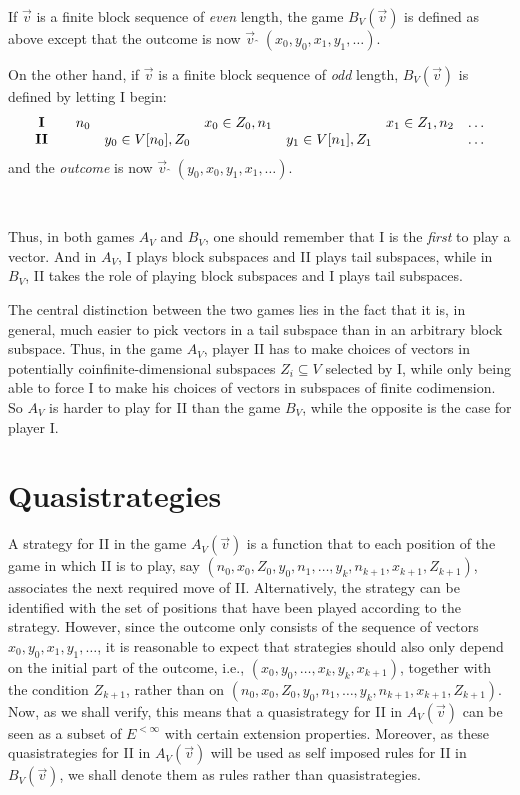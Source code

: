 \documentclass[10pt]{amsart}
\newcommand{\con}{\;\hat{}\;}
\theoremstyle{definition}
\begin{document}
If $\vec v$ is a finite block sequence of {\em even} length, the game $B_V(\vec
v)$ is defined as above except that the outcome is now $\vec v\con
(x_0,y_0,x_1,y_1,\ldots)$.

On the other hand, if $\vec v$ is a finite block sequence of {\em odd} length,
$B_V(\vec v)$ is defined by letting I begin:
$$
\begin{array}{cccccccccccc}
{\bf I} & &n_0 &  & x_0\in Z_0,n_1 &  & x_1\in Z_1,n_2 &  \ldots    \\
{\bf II} & & &y_0\in V[n_0], Z_0 &  &y_1\in V[n_1],Z_1 &  &\ldots
\end{array}
$$
and the {\em outcome} is now $\vec v\con (y_0,x_0,y_1,x_1,\ldots)$.



\

Thus, in both games $A_V$ and $B_V$, one should remember that I is the {\em
first} to play a vector. And in $A_V$, I plays block subspaces and II plays
tail subspaces, while in $B_V$, II takes the role of playing block subspaces
and I plays tail subspaces.


The central distinction between the two games lies in the fact that it is, in general, much easier to pick vectors in a tail subspace than in an arbitrary block subspace. Thus, in the game $A_V$, player II has to make choices of vectors in potentially coinfinite-dimensional subspaces $Z_i\subseteq V$ selected by I, while only being able to force I to make his choices of vectors in subspaces of finite codimension. 
So $A_V$ is harder to play for II than the game $B_V$, while the opposite is the case for player I. 









\section{Quasistrategies}
A strategy  for II in the game $A_V(\vec v)$ is a function that to each position of the game in which II is to play, say $(n_0,x_0,Z_0,y_0,n_1,\ldots, y_k,n_{k+1}, x_{k+1}, Z_{k+1})$, associates the next required move of II. 
Alternatively, the strategy can be identified with the set of positions that have been played according to the strategy.
However, since the outcome only consists of the sequence of vectors $x_0,y_0,x_1,y_1,\ldots$, it is reasonable to expect that strategies should also only depend on the initial part of the outcome, i.e., $(x_0,y_0,\ldots,x_k,y_k, x_{k+1})$, together with the condition $Z_{k+1}$, rather than on $(n_0,x_0,Z_0,y_0,n_1,\ldots, y_k,n_{k+1}, x_{k+1}, Z_{k+1})$. Now, as we shall verify, this means that a quasistrategy for II in $A_V(\vec v)$ can be seen as a subset of $E^{<\infty}$ with certain extension properties. 
Moreover, as these quasistrategies for II in $A_V(\vec v)$ will be used as self imposed rules for II in $B_V(\vec v)$, we shall denote them as rules rather than quasistrategies.
\end{document}
